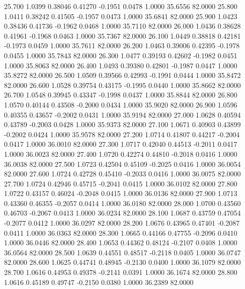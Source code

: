   25.700   1.0399   0.38046   0.41270  -0.1951   0.0478   1.0000  35.6556  82.0000
  25.800   1.0411   0.38242   0.41505  -0.1957   0.0473   1.0000  35.6841  82.0000
  25.900   1.0423   0.38436   0.41736  -0.1962   0.0468   1.0000  35.7110  82.0000
  26.000   1.0436   0.38628   0.41961  -0.1968   0.0463   1.0000  35.7367  82.0000
  26.100   1.0449   0.38818   0.42181  -0.1973   0.0459   1.0000  35.7611  82.0000
  26.200   1.0463   0.39006   0.42395  -0.1978   0.0455   1.0000  35.7843  82.0000
  26.300   1.0477   0.39193   0.42602  -0.1982   0.0451   1.0000  35.8063  82.0000
  26.400   1.0493   0.39380   0.42801  -0.1987   0.0447   1.0000  35.8272  82.0000
  26.500   1.0509   0.39566   0.42993  -0.1991   0.0444   1.0000  35.8472  82.0000
  26.600   1.0528   0.39754   0.43175  -0.1995   0.0440   1.0000  35.8662  82.0000
  26.700   1.0548   0.39945   0.43347  -0.1998   0.0437   1.0000  35.8844  82.0000
  26.800   1.0570   0.40144   0.43508  -0.2000   0.0434   1.0000  35.9020  82.0000
  26.900   1.0596   0.40355   0.43657  -0.2002   0.0431   1.0000  35.9194  82.0000
  27.000   1.0628   0.40594   0.43789  -0.2003   0.0428   1.0000  35.9373  82.0000
  27.100   1.0671   0.40903   0.43899  -0.2002   0.0424   1.0000  35.9578  82.0000
  27.200   1.0714   0.41807   0.44217  -0.2004   0.0417   1.0000  36.0010  82.0000
  27.300   1.0717   0.42040   0.44513  -0.2011   0.0417   1.0000  36.0023  82.0000
  27.400   1.0720   0.42274   0.44810  -0.2018   0.0416   1.0000  36.0038  82.0000
  27.500   1.0723   0.42504   0.45109  -0.2025   0.0416   1.0000  36.0054  82.0000
  27.600   1.0724   0.42728   0.45410  -0.2033   0.0416   1.0000  36.0075  82.0000
  27.700   1.0724   0.42946   0.45715  -0.2041   0.0415   1.0000  36.0102  82.0000
  27.800   1.0722   0.43157   0.46024  -0.2048   0.0415   1.0000  36.0136  82.0000
  27.900   1.0713   0.43360   0.46355  -0.2057   0.0414   1.0000  36.0180  82.0000
  28.000   1.0700   0.43560   0.46703  -0.2067   0.0413   1.0000  36.0234  82.0000
  28.100   1.0687   0.43759   0.47054  -0.2077   0.0412   1.0000  36.0297  82.0000
  28.200   1.0676   0.43965   0.47401  -0.2087   0.0411   1.0000  36.0363  82.0000
  28.300   1.0665   0.44166   0.47755  -0.2096   0.0410   1.0000  36.0446  82.0000
  28.400   1.0653   0.44362   0.48124  -0.2107   0.0408   1.0000  36.0564  82.0000
  28.500   1.0639   0.44551   0.48517  -0.2118   0.0405   1.0000  36.0747  82.0000
  28.600   1.0625   0.44741   0.48945  -0.2130   0.0400   1.0000  36.1079  82.0000
  28.700   1.0616   0.44953   0.49378  -0.2141   0.0391   1.0000  36.1674  82.0000
  28.800   1.0616   0.45189   0.49747  -0.2150   0.0380   1.0000  36.2389  82.0000
